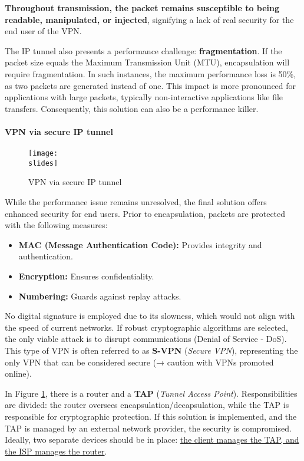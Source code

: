 \textbf{Throughout transmission, the packet remains susceptible to being readable, manipulated, or injected}, signifying a lack of real security for the end user of the VPN.

The IP tunnel also presents a performance challenge: \textbf{fragmentation}. If the packet size equals the Maximum Transmission Unit (MTU), encapsulation will require fragmentation. In such instances, the maximum performance loss is 50\%, as two packets are generated instead of one. This impact is more pronounced for applications with large packets, typically non-interactive applications like file transfers. Consequently, this solution can also be a performance killer.


\paragraph{VPN via secure IP tunnel}

\begin{figure}[h]
    \centering
    \texttt{[image: \\slides]}
    \caption{VPN via secure IP tunnel}
    \label{fig:vpn-secure-ip}
\end{figure}

While the performance issue remains unresolved, the final solution offers enhanced security for end users. Prior to encapsulation, packets are protected with the following measures:
\begin{itemize}
    \item \textbf{MAC (Message Authentication Code):} Provides integrity and authentication.
    \item \textbf{Encryption:} Ensures confidentiality.
    \item \textbf{Numbering:} Guards against replay attacks.
\end{itemize}

No digital signature is employed due to its slowness, which would not align with the speed of current networks. If robust cryptographic algorithms are selected, the only viable attack is to disrupt communications (Denial of Service - DoS). This type of VPN is often referred to as \textbf{S-VPN} (\textit{Secure VPN}), representing the only VPN that can be considered secure (→ caution with VPNs promoted online).

In Figure \ref*{fig:vpn-secure-ip}, there is a router and a \textbf{TAP} (\textit{Tunnel Access Point}). Responsibilities are divided: the router oversees encapsulation/decapsulation, while the TAP is responsible for cryptographic protection. If this solution is implemented, and the TAP is managed by an external network provider, the security is compromised. Ideally, two separate devices should be in place: \ul{the client manages the TAP, and the ISP manages the router}.

